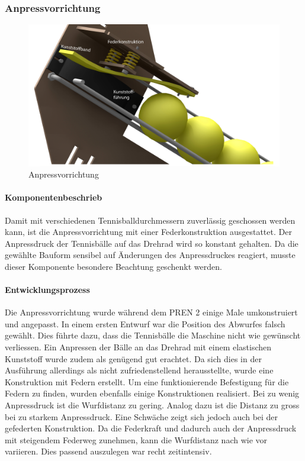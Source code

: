 \subsubsection{Anpressvorrichtung}
\begin{figure}[h!]
	\centering
	\includegraphics[width=\linewidth]{../../fig/Render-Anpressvorrichtungx}
	\caption{Anpressvorrichtung}
	\label{fig:Anpressvorrichtung}
\end{figure}

\paragraph{Komponentenbeschrieb}
Damit mit verschiedenen Tennisballdurchmessern zuverlässig geschossen werden kann, ist die Anpressvorrichtung mit einer Federkonstruktion ausgestattet. Der Anpressdruck der Tennisbälle auf das Drehrad wird so konstant gehalten. Da die gewählte Bauform sensibel auf Änderungen des Anpressdruckes reagiert, musste dieser Komponente besondere Beachtung geschenkt werden. 

\paragraph{Entwicklungsprozess}
Die Anpressvorrichtung wurde während dem PREN 2 einige Male umkonstruiert und angepasst. In einem ersten Entwurf war die Position des Abwurfes falsch gewählt. Dies führte dazu, dass die Tennisbälle die Maschine nicht wie gewünscht verliessen. Ein Anpressen der Bälle an das Drehrad mit einem elastischen Kunststoff wurde zudem als genügend gut erachtet. Da sich dies in der Ausführung allerdings als nicht zufriedenstellend herausstellte, wurde eine Konstruktion mit Federn erstellt. Um eine funktionierende Befestigung für die Federn zu finden, wurden ebenfalls einige Konstruktionen realisiert. Bei zu wenig Anpressdruck ist die Wurfdistanz zu gering. Analog dazu ist die Distanz zu gross bei zu starkem Anpressdruck. Eine Schwäche zeigt sich jedoch auch bei der gefederten Konstruktion. Da die Federkraft und dadurch auch der Anpressdruck mit steigendem Federweg zunehmen, kann die Wurfdistanz nach wie vor variieren. Dies passend auszulegen war recht zeitintensiv.
